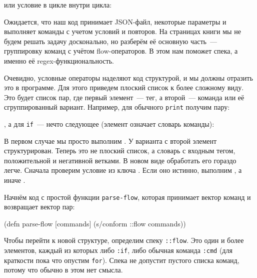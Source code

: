 \noindent
или условие в цикле внутри цикла:

\begin{clojure}
\end{clojure}

Ожидается, что наш код принимает JSON-файл, некоторые параметры и выполняет
команды с учетом условий и повторов. На страницах книги мы не будем решать
задачу досконально, но разберём её основную часть~--- группировку команд с
учётом flow-операторов. В этом нам поможет спека, а именно её
regex-функциональность.


Очевидно, условные операторы наделяют код структурой, и мы должны отразить это в
программе. Для этого приведем плоский список к более сложному виду. Это
будет список пар, где первый элемент~--- тег, а второй~--- команда или её
сгруппированный вариант. Например, для обычного \texttt{print} получим пару:

\begin{clojure}
\end{clojure}

\noindent
, а для \texttt{if}~--- нечто следующее (элемент  означает словарь
команды):

\begin{clojure}
\end{clojure}

В первом случае мы просто выполним . У варианта с  второй
элемент структурирован. Теперь это не плоский список, а словарь с входным тегом,
положительной и негативной ветками. В новом виде обработать его гораздо
легче. Сначала проверим условие из ключа . Если оно истинно,
выполним , а иначе .

Начнём код с простой функции \texttt{parse-flow}, которая принимает вектор
команд и возвращает вектор пар:

\begin{clojure}
(defn parse-flow [commands]
  (s/conform ::flow commands))
\end{clojure}

Чтобы перейти к новой структуре, определим спеку \texttt{::flow}. Это один и
более элементов, каждый из которых либо \texttt{:if}, либо обычная команда
\texttt{:cmd} (для краткости пока что опустим \texttt{for}). Спека не допустит
пустого списка команд, потому что обычно в этом нет смысла.

